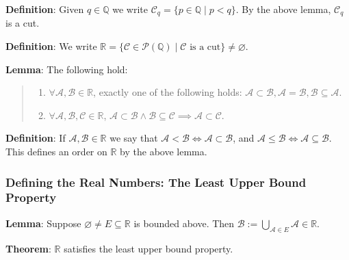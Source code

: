 \documentclass[11pt]{article}
\begin{document}
\textbf{Definition}: Given $q \in \mathbb{Q}$ we write $\mathcal{C}_q = \{p \in \mathbb{Q} \mid p < q\}$. By the above lemma, $\mathcal{C}_q$ is a cut.

\textbf{Definition}: We write $\mathbb{R} = \{\mathcal{C} \in \mathcal{P}(\mathbb{Q}) \mid \mathcal{C} \text{ is a cut}\} \neq \varnothing$.

\textbf{Lemma}: The following hold:
\begin{quote}\vspace{-0.3cm}
	\begin{enumerate}
	\item $\forall \mathcal{A}, \mathcal{B} \in \mathbb{R}$, exactly one of the following holds: $\mathcal{A} \subset \mathcal{B}, \mathcal{A} = \mathcal{B}, \mathcal{B} \subseteq \mathcal{A}$.
	\item $\forall \mathcal{A}, \mathcal{B}, \mathcal{C} \in \mathbb{R}$, $\mathcal{A} \subset \mathcal{B} \land \mathcal{B} \subseteq \mathcal{C} \implies \mathcal{A} \subset \mathcal{C}$.
	\end{enumerate}
\end{quote}

\textbf{Definition}: If $\mathcal{A}, \mathcal{B} \in \mathbb{R}$ we say that $\mathcal{A} < \mathcal{B} \iff \mathcal{A} \subset \mathcal{B}$, and $\mathcal{A} \leq \mathcal{B} \iff \mathcal{A} \subseteq \mathcal{B}$. This defines an order on $\mathbb{R}$ by the above lemma.

\subsubsection{Defining the Real Numbers: The Least Upper Bound Property}

\textbf{Lemma}: Suppose $\varnothing \neq E \subseteq \mathbb{R}$ is bounded above. Then $\mathcal{B} := \bigcup_{\mathcal{A} \in E} \mathcal{A} \in \mathbb{R}$.

\textbf{Theorem}: $\mathbb{R}$ satisfies the least upper bound property.
\end{document}
